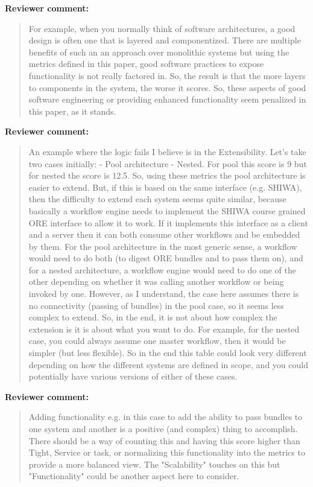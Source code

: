 \documentclass[a4]{letter}
\newenvironment{review}%
{\textbf{Reviewer comment:}\begin{quote}}%
{\end{quote}}%
\begin{document}
\begin{letter}{}
\begin{review}
For example, when you normally think of software architectures, a good design is often one that is layered and componentized. There are multiple benefits of such an an approach over monolithic systems but using the metrics defined in this paper, good software practices to expose functionality is not really factored in. So, the result is that the more layers to components in the system, the worse it scores. So, these aspects of good software engineering or providing enhanced functionality seem penalized in this paper, as it stands. 
\end{review}

\begin{review}
An example where the logic fails I believe is in the Extensibility. Let's take two cases initially:
-	Pool architecture
-	Nested.
For pool this score is 9 but for nested the score is 12.5. So, using these metrics the pool architecture is easier to extend.  But, if this is based on the same interface (e.g. SHIWA), then the difficulty to extend each system seems quite similar, because basically a workflow engine needs to implement the SHIWA course grained ORE interface to allow it to work. If it implements this interface as a client and a server then it can both consume other workflows and be embedded by them. For the pool architecture in the most generic sense, a workflow would need to do both (to digest ORE bundles and to pass them on), and for a nested architecture, a workflow engine would need to do one of the other depending on whether it was calling another workflow or being invoked by one.  However, as I understand, the case here assumes there is no connectivity (passing of bundles) in the pool case, so it seems less complex to extend. So, in the end, it is not about how complex the extension is
it is about what you want to do.  For example, for the nested case, you could always assume one master workflow, then it would be simpler (but less flexible). So in the end this table could look very different depending on how the different systems are defined in scope, and you could potentially have various versions of either of these cases. 
\end{review}

\begin{review}
Adding functionality e.g. in this case to add the ability to pass bundles to one system and another is a positive (and complex) thing to accomplish. There should be a way of counting this and having this score higher than Tight, Service or task, or normalizing this functionality into the metrics to provide a more balanced view. The "Scalability" touches on this but "Functionality" could be another aspect here to consider.
\end{review}


\end{letter}
\end{document}

